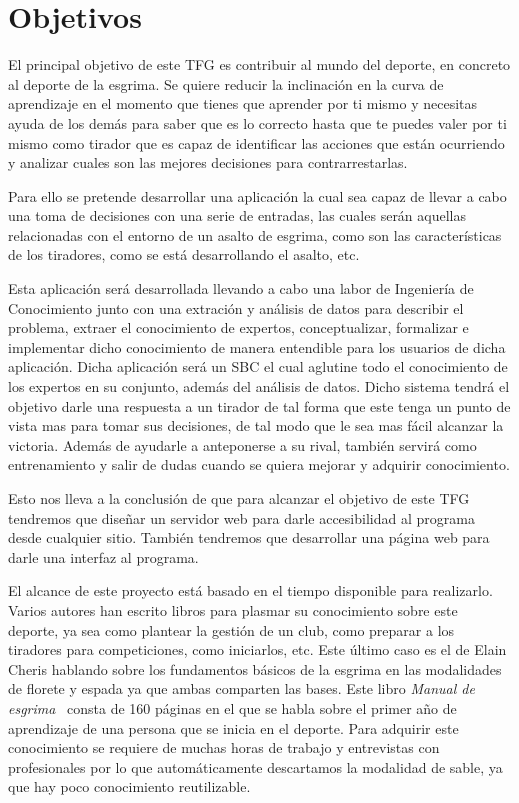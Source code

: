 \documentclass[11pt,a4paper,twoside,final]{article}
\begin{document}
\newpage

\section{Objetivos}

El principal objetivo de este TFG es contribuir al mundo del deporte, en concreto al deporte de la esgrima.
 Se quiere reducir la inclinación en la curva de aprendizaje en el momento que tienes que aprender por ti
 mismo y necesitas ayuda de los demás para saber que es lo correcto hasta que te puedes valer por ti mismo
 como tirador que es capaz de identificar las acciones que están ocurriendo y analizar cuales son las mejores
 decisiones para contrarrestarlas.

\medskip
Para ello se pretende desarrollar una aplicación la cual sea capaz de llevar a cabo una toma de decisiones
 con una serie de entradas, las cuales serán aquellas relacionadas con el entorno de un asalto de esgrima,
 como son las características de los tiradores, como se está desarrollando el asalto, etc.

\medskip
Esta aplicación será desarrollada llevando a cabo una labor de Ingeniería de Conocimiento junto con una extración y análisis de datos
 para describir el problema, extraer el conocimiento de expertos, conceptualizar, formalizar e implementar dicho conocimiento
 de manera entendible para los usuarios de dicha aplicación.
Dicha aplicación será un SBC el cual aglutine todo el conocimiento de los expertos en
 su conjunto, además del análisis de datos. Dicho sistema tendrá el objetivo darle una respuesta a un tirador
 de tal forma que este tenga un punto de vista mas para tomar sus decisiones, de tal modo que le sea mas fácil
 alcanzar la victoria. Además de ayudarle a anteponerse a su rival, también servirá como entrenamiento y salir
 de dudas cuando se quiera mejorar y adquirir conocimiento.

Esto nos lleva a la conclusión de que para alcanzar el objetivo de este TFG tendremos que diseñar un servidor web
 para darle accesibilidad al programa desde cualquier sitio. También tendremos que desarrollar una página web
 para darle una interfaz al programa.

\medskip
El alcance de este proyecto está basado en el tiempo disponible para realizarlo. Varios autores han escrito
 libros para plasmar su conocimiento sobre este deporte, ya sea como plantear la gestión de un club, como
 preparar a los tiradores para competiciones, como iniciarlos, etc. Este último caso es el de Elain Cheris
 hablando sobre los fundamentos básicos de la esgrima en las modalidades de florete y espada ya que ambas
 comparten las bases. Este libro \textit{Manual de esgrima}~\cite{manualdeesgrima} consta de 160 páginas
 en el que se habla sobre el primer año de aprendizaje de una persona que se inicia en el deporte. Para
 adquirir este conocimiento se requiere de muchas horas de trabajo y entrevistas con profesionales por
 lo que automáticamente descartamos la modalidad de sable, ya que hay poco conocimiento reutilizable.
\end{document}
